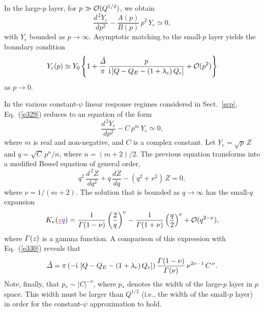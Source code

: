 \documentclass[12pt,prb,aps]{revtex4-1}
\providecommand{\DIFadd}[1]{{\protect\color{blue}\uwave{#1}}} %
\providecommand{\DIFdel}[1]{{\protect\color{red}\sout{#1}}}                      %
\providecommand{\DIFaddbegin}{} %
\providecommand{\DIFaddend}{} %
\providecommand{\DIFdelbegin}{} %
\providecommand{\DIFdelend}{} %
\begin{document}
In the large-$p$ layer, for  $p\gg {\cal O}(Q^{1/2})$, we obtain 
\begin{equation}\label{e329}
\frac{d^{\,2} Y_e}{dp^2} - \frac{A(p)}{B(p)}\,p^2\,Y_e\simeq 0,
\end{equation}
with $Y_e$ bounded as $p\rightarrow \infty$. Asymptotic matching to the small-$p$ layer yields the boundary
condition 
\begin{equation}\label{e330}
Y_e(p)\simeq Y_0\left\{1+ \frac{\hat{\mit\Delta}}{\pi}\,\frac{p}{{\rm i}\,[Q-Q_E-(1+\lambda_e)\,Q_e]}+ {\cal O}(p^2)\right\}
\end{equation}
as $p\rightarrow 0$. 

In the various constant-$\psi$ linear response regimes considered in Sect.~\ref{scp}, Eq.~(\ref{e329}) reduces to an
equation of the form
\begin{equation}\label{e330a}
\frac{d^{\,2}Y_e}{dp^2}- C\,p^m\,Y_e\simeq 0,
\end{equation}
where $m$ is real and non-negative, and $C$ is a complex constant. Let $Y_e=\sqrt{p}\,Z$ and $q=\sqrt{C}\,p^n/n$, where
$n=(m+2)/2$. The previous equation transforms into a modified Bessel equation of general order, 
\begin{equation}
q^2\,\frac{d^{\,2}Z}{dq^2} + q\,\frac{dZ}{dq} - (q^2+\nu^2)\,Z =0,
\end{equation}
where $\nu=1/(m+2)$. The solution that is bounded as $q\rightarrow \infty$ has the small-$q$
expansion
\begin{equation}\label{e332}
K_\nu(\DIFdelbegin \DIFdel{z}\DIFdelend \DIFaddbegin \DIFadd{q}\DIFaddend )= \frac{1}{{\mit\Gamma}(1-\nu)}\left(\frac{2}{q}\right)^\nu - \frac{1}{{\mit\Gamma}(1+\nu)}\left(\frac{q}{2}\right)^\nu + {\cal O}(q^{2-\nu}),
\end{equation}
where ${\mit\Gamma}(z)$ is a gamma function. 
A comparison of this expression with Eq.~(\ref{e330}) reveals that
\begin{equation}
\hat{\mit\Delta} = \pi\,(-{\rm i}\,\left[Q-Q_E-(1+\lambda_e)\,Q_e\right])\, \frac{{\mit\Gamma}(1-\nu)}{{\mit\Gamma}(\nu)}\,\nu^{2\nu-1}\,C^{\,\nu}.
\end{equation}
Note, finally, that $p_\ast\sim |C|^{-\nu}$, where $p_\ast$ denotes the width of the large-$p$ layer in $p$ space. This width must be larger than $Q^{1/2}$ (i.e., the width of the small-$p$ layer) in order for the constant-$\psi$ approximation to hold. 
\end{document}

